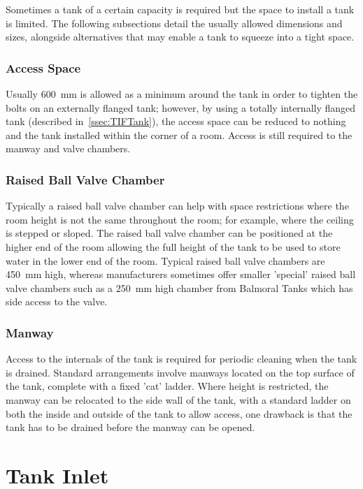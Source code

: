Sometimes a tank of a certain capacity is required but the space to install a tank is limited.  The following subsections detail the usually allowed dimensions and sizes, alongside alternatives that may enable a tank to squeeze into a tight space.

\subsubsection{Access Space}

Usually \SI{600}{\milli\metre} is allowed as a minimum around the tank in order to tighten the bolts on an externally flanged tank; however, by using a totally internally flanged tank (described in~\autoref{ssec:TIFTank}), the access space can be reduced to nothing and the tank installed within the corner of a room.  Access is still required to the manway and valve chambers.

\subsubsection{Raised Ball Valve Chamber}

Typically a raised ball valve chamber can help with space restrictions where the room height is not the same throughout the room; for example, where the ceiling is stepped or sloped.  The raised ball valve chamber can be positioned at the higher end of the room allowing the full height of the tank to be used to store water in the lower end of the room.
Typical raised ball valve chambers are \SI{450}{\milli\metre} high, whereas manufacturers sometimes offer smaller 'special' raised ball valve chambers such as a \SI{250}{\milli\metre} high chamber from Balmoral Tanks which has side access to the valve.

\subsubsection{Manway}

Access to the internals of the tank is required for periodic cleaning when the tank is drained.  Standard arrangements involve manways located on the top surface of the tank, complete with a fixed 'cat' ladder.  Where height is restricted, the manway can be relocated to the side wall of the tank, with a standard ladder on both the inside and outside of the tank to allow access, one drawback is that the tank has to be drained before the manway can be opened.

\section{Tank Inlet}

